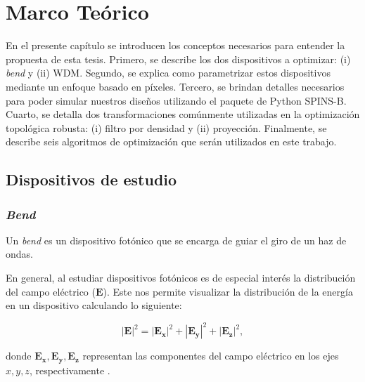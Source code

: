 \chapter{Marco  Teórico}

En el presente capítulo se introducen los conceptos necesarios para entender la propuesta de esta tesis.
Primero, se describe los dos dispositivos a optimizar: (i) \emph{bend} y (ii) WDM.
Segundo, se explica como parametrizar estos dispositivos mediante un enfoque basado en píxeles.
Tercero, se brindan detalles necesarios para poder simular nuestros diseños utilizando el paquete de Python
SPINS-B.
Cuarto, se detalla dos transformaciones comúnmente utilizadas en la optimización topológica robusta: 
(i) filtro por densidad y (ii) proyección.
Finalmente, se describe seis algoritmos de optimización que serán utilizados en este trabajo.

\section{Dispositivos de estudio}

\subsection{\emph{Bend}}

Un \emph{bend} es un dispositivo fotónico que se encarga de guiar el giro de un haz de ondas.

En general, al estudiar dispositivos fotónicos es de especial interés la
distribución del campo eléctrico ($\boldsymbol{E}$).
Este nos permite visualizar la distribución de la energía en un dispositivo calculando lo siguiente:

\begin{equation}
  |\boldsymbol{E}|^2 = |\boldsymbol{E_x}|^2+|\boldsymbol{E_y}|^2+|\boldsymbol{E_z}|^2,
\label{eq:field}
\end{equation}

donde $\boldsymbol{E_x}, \boldsymbol{E_y}, \boldsymbol{E_z}$ representan las componentes del campo eléctrico
en los ejes $x, y, z$, respectivamente
\citep{LukasChrostowski2010}.

